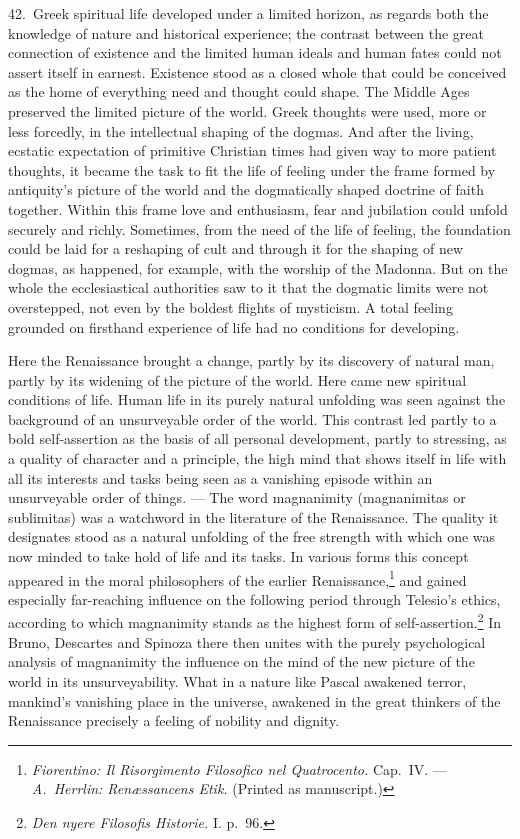 \documentclass[12pt]{book}
\newcommand{\opage}[1]{\marginnote{\footnotesize\textit{[#1]}}}
\begin{document}
42.~Greek spiritual life developed under a limited horizon, as regards both the knowledge of
nature and historical experience; the contrast between the great connection of existence and
the limited human ideals and human fates could not assert itself in earnest. Existence stood
as a closed whole that could be conceived as the home of everything need and thought could
shape. The Middle Ages preserved the limited picture of the world. Greek thoughts were used,
more or less forcedly, in the intellectual shaping of the dogmas. And after the living,
ecstatic expectation of primitive Christian times had given way to more patient thoughts, it
became the task to fit the life of feeling under the frame formed by antiquity's picture of the
world and the dogmatically shaped doctrine of faith together. Within this frame love and
enthusiasm, fear and jubilation could unfold securely and richly. Sometimes, from the need of
the life of feeling, the foundation could be laid for a reshaping of cult and through it for
the shaping of new dogmas, as happened, for example, with the worship of the Madonna. But on
the whole the ecclesiastical authorities saw to it that the dogmatic limits were not
overstepped, not even by the boldest flights of mysticism. A total feeling grounded on
firsthand experience of life had no conditions for developing.

Here the Renaissance brought a change, partly by its discovery of natural man, partly by its
widening of the picture of the world. Here came new spiritual conditions of life. Human life in
its purely natural unfolding was seen against the background of an unsurveyable order of the
world. This contrast led partly to \opage{143}a bold self-assertion as the basis of all personal
development, partly to stressing, as a quality of character and a principle, the high mind that
shows itself in life with all its interests and tasks being seen as a vanishing episode within
an unsurveyable order of things. --- The word magnanimity (magnanimitas or sublimitas) was a
watchword in the literature of the Renaissance. The quality it designates stood as a natural
unfolding of the free strength with which one was now minded to take hold of life and its
tasks. In various forms this concept appeared in the moral philosophers of the earlier
Renaissance,\footnote{\textit{Fiorentino: Il Risorgimento Filosofico nel Quatrocento.} Cap.~IV.
--- \textit{A.~Herrlin: Renæssancens Etik.} (Printed as manuscript.)} and gained especially
far-reaching influence on the following period through Telesio's ethics, according to which
magnanimity stands as the highest form of self-assertion.\footnote{\textit{Den nyere Filosofis
Historie.} I. p.~96.} In Bruno, Descartes and Spinoza there then unites with the purely
psychological analysis of magnanimity the influence on the mind of the new picture of the world
in its unsurveyability. What in a nature like Pascal awakened terror, mankind's vanishing place
in the universe, awakened in the great thinkers of the Renaissance precisely a feeling of
nobility and dignity.
\end{document}
